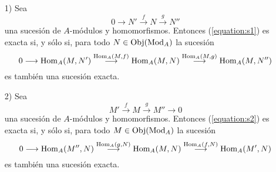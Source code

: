 \documentclass[../main.tex]{subfiles}
\begin{document}
\begin{proposition}\label{pry}
\begin{itemize}
    \item[1)] Sea\begin{equation}\label{equation:s1}
        0\longrightarrow N'\overset{f}{\longrightarrow}N\overset{g}{\longrightarrow}N''
    \end{equation}
    una sucesión de $A$-módulos y homomorfismos. Entonces (\ref{equation:s1}) es exacta si, y sólo si, para todo $N\in\operatorname{Obj}(\operatorname{Mod}_A)$ la sucesión\begin{equation}\label{equation:s1'}
        0\longrightarrow \operatorname{Hom}_A(M,N')\overset{\operatorname{Hom}_A(M,f)}{\longrightarrow}\operatorname{Hom}_A(M,N)\overset{\operatorname{Hom}_A(M,g)}{\longrightarrow}\operatorname{Hom}_A(M,N'')
    \end{equation}
    es también una sucesión exacta.
    \item[2)] Sea\begin{equation}\label{equation:s2}
        M'\overset{f}{\longrightarrow}M\overset{g}{\longrightarrow}M''\longrightarrow 0
    \end{equation}
    una sucesión de $A$-módulos y homomorfismos. Entonces (\ref{equation:s2}) es exacta si, y sólo si, para todo $M\in\operatorname{Obj}(\operatorname{Mod}_A)$ la sucesión
    \begin{equation}\label{equation:s2'}0\longrightarrow\operatorname{Hom}_A(M'',N)\overset{\operatorname{Hom}_A(g,N)}{\longrightarrow}\operatorname{Hom}_A(M,N)\overset{\operatorname{Hom}_A(f,N)}{\longrightarrow}\operatorname{Hom}_A(M',N)\end{equation}
    es también una sucesión exacta.
\end{itemize}
\end{proposition}
\end{document}
